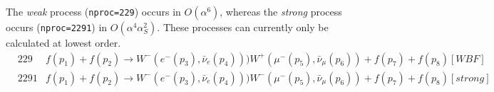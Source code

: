 The {\it weak} process ({\tt nproc=229})  occurs in $O(\alpha^6)$,
whereas the {\it strong} process occurs ({\tt nproc=2291}) in $O(\alpha^4 \alpha_S^2)$.  
These processes can currently only be calculated at lowest order.
\begin{eqnarray}
& 229 &   f(p_1)+f(p_2) \to W^-(e^-(p_3),\bar{\nu}_e(p_4)))W^+(\mu^-(p_5),\bar{\nu}_\mu(p_6))+f(p_7)+f(p_8) [WBF]
\nonumber \\
&2291 &  f(p_1)+f(p_2) \to W^-(e^-(p_3),\bar{\nu}_e(p_4)))W^-(\mu^-(p_5),\bar{\nu}_\mu(p_6))+f(p_7)+f(p_8) [strong]
\nonumber
\end{eqnarray}
